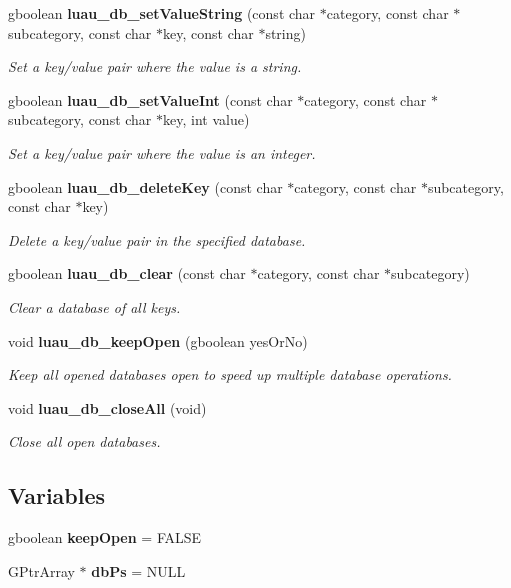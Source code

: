\begin{CompactItemize}
gboolean {\bf luau\_\-db\_\-set\-Value\-String} (const char $\ast$category, const char $\ast$subcategory, const char $\ast$key, const char $\ast$string)
\begin{CompactList}\small\item\em Set a key/value pair where the value is a string. \item\end{CompactList}\item 
gboolean {\bf luau\_\-db\_\-set\-Value\-Int} (const char $\ast$category, const char $\ast$subcategory, const char $\ast$key, int value)
\begin{CompactList}\small\item\em Set a key/value pair where the value is an integer. \item\end{CompactList}\item 
gboolean {\bf luau\_\-db\_\-delete\-Key} (const char $\ast$category, const char $\ast$subcategory, const char $\ast$key)
\begin{CompactList}\small\item\em Delete a key/value pair in the specified database. \item\end{CompactList}\item 
gboolean {\bf luau\_\-db\_\-clear} (const char $\ast$category, const char $\ast$subcategory)
\begin{CompactList}\small\item\em Clear a database of all keys. \item\end{CompactList}\item 
void {\bf luau\_\-db\_\-keep\-Open} (gboolean yes\-Or\-No)
\begin{CompactList}\small\item\em Keep all opened databases open to speed up multiple database operations. \item\end{CompactList}\item 
void {\bf luau\_\-db\_\-close\-All} (void)
\begin{CompactList}\small\item\em Close all open databases. \item\end{CompactList}\end{CompactItemize}
\subsection*{Variables}
\begin{CompactItemize}
\item 
gboolean {\bf keep\-Open} = FALSE
\item 
GPtr\-Array $\ast$ {\bf db\-Ps} = NULL
\end{CompactItemize}


